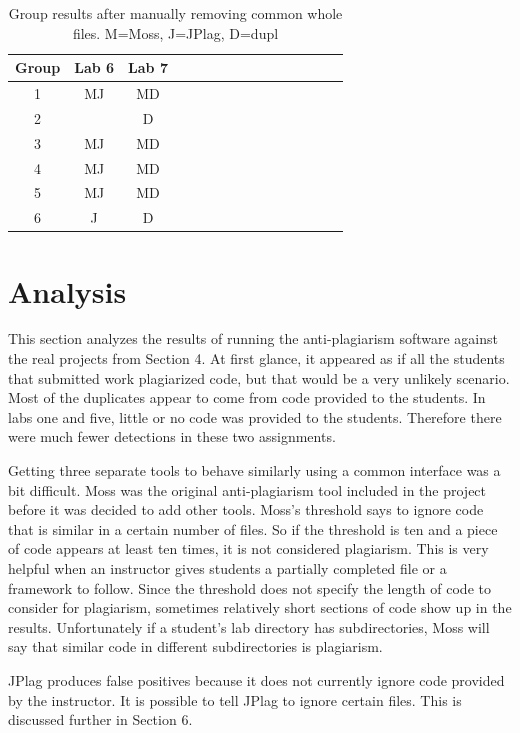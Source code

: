 \documentclass[10pt,journal,compsoc]{IEEEtran}
\begin{document}
		\begin{table}[h!]
			\begin{center}
				\caption{Group results after manually removing common whole files. M=Moss, J=JPlag, D=dupl}
				\label{tab:newResults2}
				\begin{tabular}{ccccccccccccccc}
					\toprule
					Group & Lab 6 & Lab 7\\
					\midrule
					1 & MJ & MD\\
					2 &  & D\\
					3 & MJ & MD\\
					4 & MJ & MD\\
					5 & MJ & MD\\
					6 & J & D\\
					\bottomrule
				\end{tabular}
			\end{center}
		\end{table}
	
	\section{Analysis}
	This section analyzes the results of running the anti-plagiarism software against the real projects from Section 4. At first glance, it appeared as if all the students that submitted work plagiarized code, but that would be a very unlikely scenario. Most of the duplicates appear to come from code provided to the students. In labs one and five, little or no code was provided to the students. Therefore there were much fewer detections in these two assignments.
	
	Getting three separate tools to behave similarly using a common interface was a bit difficult. Moss was the original anti-plagiarism tool included in the project before it was decided to add other tools. Moss's threshold says to ignore code that is similar in a certain number of files. So if the threshold is ten and a piece of code appears at least ten times, it is not considered plagiarism. This is very helpful when an instructor gives students a partially completed file or a framework to follow. Since the threshold does not specify the length of code to consider for plagiarism, sometimes relatively short sections of code show up in the results. Unfortunately if a student's lab directory has subdirectories, Moss will say that similar code in different subdirectories is plagiarism.
	
	JPlag produces false positives because it does not currently ignore code provided by the instructor. It is possible to tell JPlag to ignore certain files. This is discussed further in Section 6.
	
\end{document}
